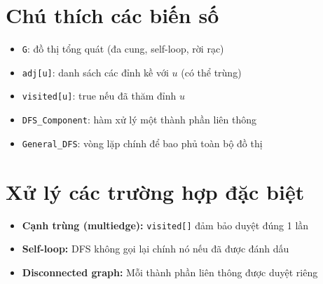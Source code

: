 \documentclass[12pt]{article}
\begin{document}
\section*{Chú thích các biến số}
\begin{itemize}
    \item \texttt{G}: đồ thị tổng quát (đa cung, self-loop, rời rạc)
    \item \texttt{adj[u]}: danh sách các đỉnh kề với $u$ (có thể trùng)
    \item \texttt{visited[u]}: true nếu đã thăm đỉnh $u$
    \item \texttt{DFS\_Component}: hàm xử lý một thành phần liên thông
    \item \texttt{General\_DFS}: vòng lặp chính để bao phủ toàn bộ đồ thị
\end{itemize}

\section*{Xử lý các trường hợp đặc biệt}
\begin{itemize}
    \item \textbf{Cạnh trùng (multiedge):} \texttt{visited[]} đảm bảo duyệt đúng 1 lần
    \item \textbf{Self-loop:} DFS không gọi lại chính nó nếu đã được đánh dấu
    \item \textbf{Disconnected graph:} Mỗi thành phần liên thông được duyệt riêng
\end{itemize}
\end{document}
